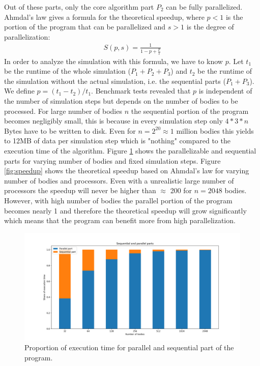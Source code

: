 \documentclass[a4paper,11pt]{scrartcl} %
\begin{document}
Out of these parts, only the core algorithm part $P_2$ can be fully parallelized. Ahmdal's law gives a formula for the theoretical speedup, where $p < 1$ is the portion of the program that can be parallelized and $s > 1$ is the degree of parallelization:
\begin{align*}
 S(p,s) = \frac{1}{1-p+\frac{p}{s}}
\end{align*}
In order to analyze the simulation with this formula, we have to know $p$. Let $t_1$ be the runtime of the whole simulation ($P_1 + P_2 + P_3$) and $t_2$ be the runtime of the simulation without the actual simulation, i.e. the sequential parts ($P_1 + P_3$). We define $p = (t_1 - t_2) / t_1$. Benchmark tests revealed that $p$ is independent of the number of simulation steps but depends on the number of bodies to be processed. For large number of bodies $n$ the sequential portion of the program becomes negligibly small, this is because in every simulation step only $4 * 3 * n$ Bytes have to be written to disk. Even for $n=2^{20} \approx 1$ million bodies this yields to 12MB of data per simulation step which is "nothing" compared to the execution time of the algorithm. Figure \ref{fig:seq_par} shows the parallelizable and sequential parts for varying number of bodies and fixed simulation steps. Figure \ref{fig:speedup} shows the theoretical speedup based on Ahmdal's law for varying number of bodies and processors. Even with a unrealistic large number of processors the speedup will never be higher than $\approx$ 200 for $n=2048$ bodies. However, with high number of bodies the parallel portion of the program becomes nearly 1 and therefore the theoretical speedup will grow significantly which means that the program can benefit more from high parallelization.

\begin{figure}[h!]
  \centering
  \includegraphics[width=\textwidth]{img/par_seq.png}
  \caption{Proportion of execution time for parallel and sequential part of the program.}
  \label{fig:seq_par}
\end{figure}
\end{document}

